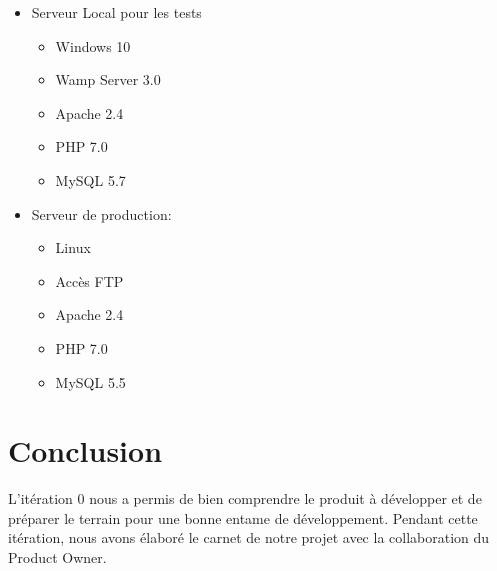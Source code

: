 \begin{itemize}
    \item Serveur Local pour les tests
        \begin{itemize}
            \item Windows 10
            \item Wamp Server 3.0
            \item Apache 2.4
            \item PHP 7.0
            \item MySQL 5.7
        \end{itemize}
    \item Serveur de production:
        \begin{itemize}
            \item Linux
            \item Accès FTP
            \item Apache 2.4
            \item PHP 7.0
            \item MySQL 5.5
        \end{itemize}
\end{itemize}

\section*{Conclusion}

L'itération 0 nous a permis de bien comprendre le produit à développer et de
préparer le terrain pour une bonne entame de développement. Pendant cette
itération, nous avons élaboré le carnet de notre projet avec la collaboration
du Product Owner.
